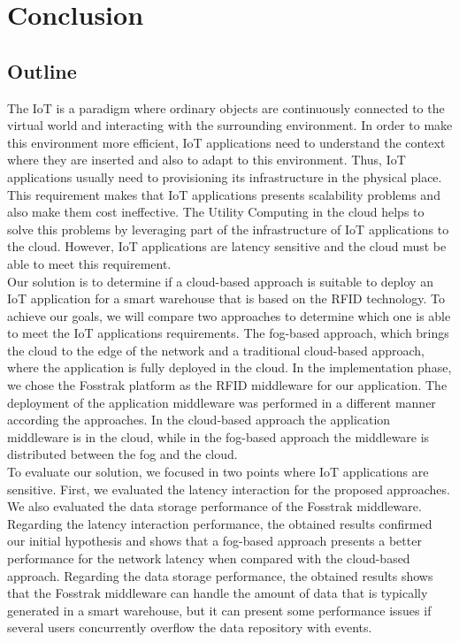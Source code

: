 
\chapter{Conclusion}
\label{chapter:conclusion}

\section{Outline}
\label{sec:outline}
The \acrfull{IoT} is a paradigm where ordinary objects are continuously connected to the virtual
world and interacting with the surrounding environment. In order to make this environment more efficient,
\gls{IoT} applications need to understand the context where they are inserted and also to adapt to this
environment. Thus, \gls{IoT} applications usually need to provisioning its infrastructure
in the physical place. This requirement makes that \gls{IoT} applications presents scalability
problems and also make them cost ineffective. The Utility Computing in the cloud helps to solve this
problems by leveraging part of the infrastructure of \gls{IoT} applications to the cloud. However,
\gls{IoT} applications are latency sensitive and the cloud must be able to meet this requirement.\\

Our solution is to determine if a cloud-based approach is suitable to deploy an \gls{IoT} application
for a smart warehouse that is based on the \gls{RFID} technology. To achieve our goals, we will
compare two approaches to determine which one is able to meet the \gls{IoT} applications requirements.
The fog-based approach, which brings the cloud to the edge of the network and a traditional cloud-based
approach, where the application is fully deployed in the cloud. In the implementation phase, we chose
the Fosstrak platform as the \gls{RFID} middleware for our application. The deployment of the
application middleware was performed in a different manner according the approaches. In the cloud-based
approach the application middleware is in the cloud, while in the fog-based approach the middleware
is distributed between the fog and the cloud.\\

To evaluate our solution, we focused in two points where \gls{IoT} applications are sensitive. First,
we evaluated the latency interaction for the proposed approaches. We also evaluated the data storage
performance of the Fosstrak middleware. Regarding the latency interaction performance, the obtained
results confirmed our initial hypothesis and shows that a fog-based approach presents a better
performance for the network latency when compared with the cloud-based approach. Regarding the data
storage performance, the obtained results shows that the Fosstrak middleware can handle the amount
of data that is typically generated in a smart warehouse, but it can present some performance issues
if several users concurrently overflow the data repository with events.

